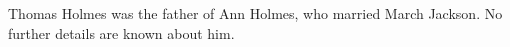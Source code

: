 
Thomas Holmes was the father of Ann Holmes, who married March Jackson.  No further details are known about him.
